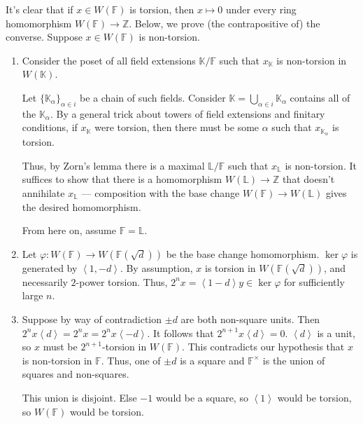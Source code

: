 \documentclass[12 pt, letterpaper]{hmcpset}
\begin{document}
\begin{solution}
	It's clear that if $x \in W(\mathbb{F})$ is torsion, then $x \mapsto 0$ under every ring homomorphism $W(\mathbb{F}) \to \mathbb{Z}$. Below, we prove (the contrapositive of) the converse. Suppose $x \in W(\mathbb{F})$ is non-torsion.

	\begin{enumerate} 
		\item Consider the poset of all field extensions $\mathbb{K} / \mathbb{F}$ such that $x_{\mathbb{K}}$ is non-torsion in $W(\mathbb{K})$. 

			Let $\{ \mathbb{K}_{\alpha} \}_{\alpha \in i}$ be a chain of such fields. Consider $\mathbb{K} = \bigcup_{\alpha \in i} \mathbb{K}_{\alpha}$ contains all of the $\mathbb{K}_{\alpha}$. By a general trick about towers of field extensions and finitary conditions, if $x_{\mathbb{K}}$ were torsion, then there must be some $\alpha$ such that $x_{\mathbb{K}_{\alpha}}$ is torsion.

			Thus, by Zorn's lemma there is a maximal $\mathbb{L} / \mathbb{F}$ such that $x_{\mathbb{L}}$ is non-torsion. It suffices to show that there is a homomorphism $W(\mathbb{L}) \to \mathbb{Z}$ that doesn't annihilate $x_{\mathbb{L}}$ --- composition with the base change $W(\mathbb{F}) \to W(\mathbb{L})$ gives the desired homomorphism.

			From here on, assume $\mathbb{F} = \mathbb{L}$.

		\item Let $\varphi : W(\mathbb{F}) \to W(\mathbb{F}(\sqrt{d}))$ be the base change homomorphism. $\ker \varphi$ is generated by $\left < 1, -d \right >$. By assumption, $x$ is torsion in $W(\mathbb{F}(\sqrt{d}))$, and necessarily $2$-power torsion. Thus, $2^{n} x = \left < 1 -d \right > y \in \ker \varphi$ for sufficiently large $n$.

		\item Suppose by way of contradiction $\pm d$ are both non-square units. Then $2^{n} x\left < d \right > = 2^{n} x = 2^{n} x \left < -d \right >$. It follows that $2^{n + 1} x \left < d \right > = 0$. $\left < d \right >$ is a unit, so $x$ must be $2^{n + 1}$-torsion in $W(\mathbb{F})$. This contradicts our hypothesis that $x$ is non-torsion in $\mathbb{F}$. Thus, one of $\pm d$ is a square and $\mathbb{F}^{\times}$ is the union of squares and non-squares.

			This union is disjoint. Else $-1$ would be a square, so $\left < 1 \right >$ would be torsion, so $W(\mathbb{F})$ would be torsion.


\end{enumerate}
\end{solution}
\end{document}
